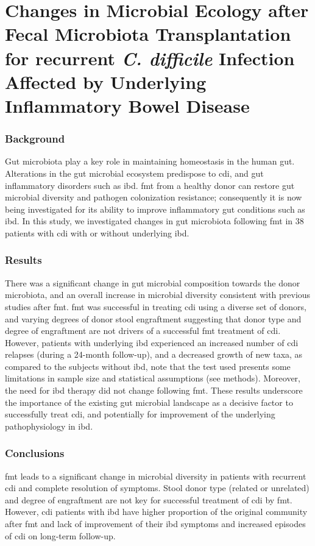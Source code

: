 \glsresetall

\section{Changes in Microbial Ecology after Fecal Microbiota Transplantation for recurrent \textit{C. difficile} Infection Affected by Underlying Inflammatory Bowel Disease}

\subsubsection{Background}
Gut microbiota play a key role in maintaining homeostasis in the human gut. Alterations in the gut microbial ecosystem predispose to \gls{cdi}, and gut inflammatory disorders such as \gls{ibd}. \Gls{fmt} from a healthy donor can restore gut microbial diversity and pathogen colonization resistance; consequently it is now being investigated for its ability to improve inflammatory gut conditions such as \gls{ibd}.  In this study, we investigated changes in gut microbiota following \gls{fmt} in 38 patients with \gls{cdi} with or without underlying \gls{ibd}. 

\subsubsection{Results}
There was a significant change in gut microbial composition towards the donor microbiota, and an overall increase in microbial diversity consistent with previous studies after \gls{fmt}. \gls{fmt} was successful in treating \gls{cdi} using a diverse set of donors, and varying degrees of donor stool engraftment suggesting that donor type and degree of engraftment are not drivers of a successful \gls{fmt} treatment of \gls{cdi}. However, patients with underlying \gls{ibd} experienced an increased number of \gls{cdi} relapses (during a 24-month follow-up), and a decreased growth of new taxa, as compared to the subjects without \gls{ibd}, note that the test used presents some limitations in sample size and statistical assumptions (see methods). Moreover, the need for \gls{ibd} therapy did not change following \gls{fmt}. These results underscore the importance of the existing gut microbial landscape as a decisive factor to successfully treat \gls{cdi}, and potentially for improvement of the underlying pathophysiology in \gls{ibd}. 

\subsubsection{Conclusions}
\Gls{fmt} leads to a significant change in microbial diversity in patients with recurrent \gls{cdi} and complete resolution of symptoms. Stool donor type (related or unrelated) and degree of engraftment are not key for successful treatment of \gls{cdi} by \gls{fmt}. However, \gls{cdi} patients with \gls{ibd} have higher proportion of the original community after \gls{fmt} and lack of improvement of their \gls{ibd} symptoms and increased episodes of \gls{cdi} on long-term follow-up.

